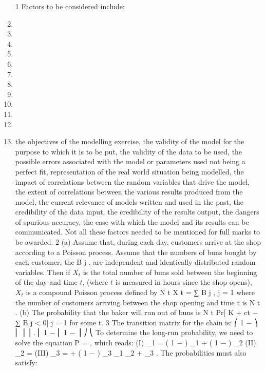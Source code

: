 \documentclass[a4paper,12pt]{article}
\begin{document}
\begin{enumerate}
1
Factors to be considered include:
\item
\item
\item
\item
\item
\item
\item
\item
\item
\item
\item
\item
the objectives of the modelling exercise,
the validity of the model for the purpose to which it is to be put,
the validity of the data to be used,
the possible errors associated with the model or parameters used not being a
perfect fit,
representation of the real world situation being modelled,
the impact of correlations between the random variables that drive the model,
the extent of correlations between the various results produced from the model,
the current relevance of models written and used in the past,
the credibility of the data input,
the credibility of the results output,
the dangers of spurious accuracy,
the ease with which the model and its results can be communicated.
Not all these factors needed to be mentioned for full marks to be awarded.
2
(a)
Assume that, during each day, customers arrive at the shop according to a Poisson process.
Assume that the numbers of buns bought by each customer, the B j , are independent and identically distributed random variables.
Then if $X_t$ is the total number of buns sold between the beginning of the day and time $t$, (where $t$ is measured in hours since the shop opens), $X_t$ is a
compound Poisson process defined by
N t
X t = ∑ B j ,
j = 1
where the number of customers arriving between the shop opening and time t
is N t .
(b)
The probability that the baker will run out of buns is
N t
Pr[ K + ct − ∑ B j < 0]
j = 1
for some t.
3
The transition matrix for the chain is:
\alpha
⎛ 1 − \alpha
⎞
⎜
⎟
\alpha ⎟ .
⎜ 1 − \alpha
⎜
1 − \alpha \alpha ⎟ ⎠
⎝
To determine the long-run probability, we need to solve the equation \pi P = \pi , which
reads:
(I) \pi_1 = ( 1 − \alpha ) \pi_1 + ( 1 − \alpha ) \pi_2
(II) \pi_2 =
(III) \pi_3 =
+ ( 1 − \alpha ) \pi_3
\alpha\pi_1
\alpha\pi_2
+
\alpha\pi_3 .
The probabilities must also satisfy:

\end{enumerate}
\end{document}
